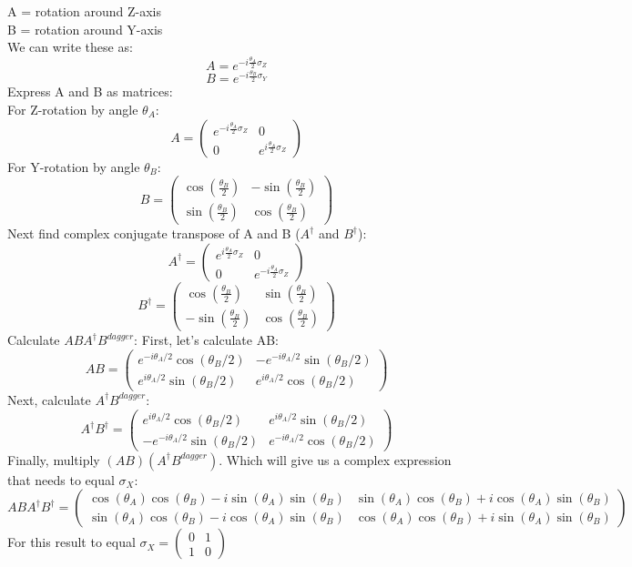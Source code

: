 \documentclass[12pt]{article}
\begin{document}
A = rotation around Z-axis 
\\
B = rotation around Y-axis
\\
We can write these as:
\[
A = e^{-i\frac{\theta_A}{2}\sigma_Z}
\]
\[
B = e^{-i\frac{\theta_B}{2}\sigma_Y}
\]
Express A and B as matrices:
\\
For Z-rotation by angle $\theta_A$:
\[
    A = \begin{pmatrix} e^{-i\frac{\theta_A}{2}\sigma_Z} & 0 \\ 0 & e^{i\frac{\theta_A}{2}\sigma_Z}\end{pmatrix}
\]
For Y-rotation by angle $\theta_B$:
\[
    B = \begin{pmatrix} \cos({\frac{\theta_B}{2}}) & -\sin({\frac{\theta_B}{2}}) \\ \sin({\frac{\theta_B}{2}}) & \cos({\frac{\theta_B}{2}}) \end{pmatrix}
\]
Next find complex conjugate transpose of A and B ($A^{\dagger}$ and $B^{\dagger}$):
\[
    A^\dagger = \begin{pmatrix} e^{i\frac{\theta_A}{2}\sigma_Z} & 0 \\ 0 & e^{-i\frac{\theta_A}{2}\sigma_Z}\end{pmatrix}
\]
\[
    B^\dagger = \begin{pmatrix} \cos({\frac{\theta_B}{2}}) & \sin({\frac{\theta_B}{2}}) \\ -\sin({\frac{\theta_B}{2}}) & \cos({\frac{\theta_B}{2}}) \end{pmatrix}
\]
Calculate $ABA^{\dagger}B^{dagger}$:
First, let's calculate AB:
\[
AB = \begin{pmatrix}
e^{-i\theta_A/2}\cos(\theta_B/2) & -e^{-i\theta_A/2}\sin(\theta_B/2) \\
e^{i\theta_A/2}\sin(\theta_B/2) & e^{i\theta_A/2}\cos(\theta_B/2)
\end{pmatrix}
\]
Next, calculate $A^{\dagger}B^{dagger}$:
\[
A^\dagger B^\dagger = \begin{pmatrix}
e^{i\theta_A/2}\cos(\theta_B/2) & e^{i\theta_A/2}\sin(\theta_B/2) \\
-e^{-i\theta_A/2}\sin(\theta_B/2) & e^{-i\theta_A/2}\cos(\theta_B/2)
\end{pmatrix}
\]
Finally, multiply $(AB)(A^{\dagger}B^{dagger})$. Which will give us a complex expression that needs to equal $\sigma_X$:
\[
ABA^\dagger B^\dagger = \begin{pmatrix}
\cos(\theta_A)\cos(\theta_B) - i\sin(\theta_A)\sin(\theta_B) & \sin(\theta_A)\cos(\theta_B) + i\cos(\theta_A)\sin(\theta_B) \\
\sin(\theta_A)\cos(\theta_B) - i\cos(\theta_A)\sin(\theta_B) & \cos(\theta_A)\cos(\theta_B) + i\sin(\theta_A)\sin(\theta_B)
\end{pmatrix}
\]
For this result to equal $\sigma_X = \begin{pmatrix} 0 & 1 \\ 1 & 0 \end{pmatrix}$
\end{document}
